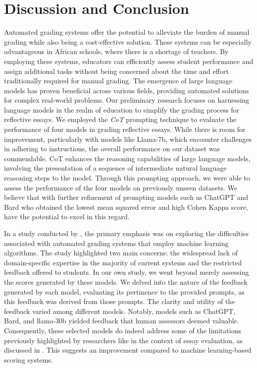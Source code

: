 \documentclass{article}
\begin{document}
\section{Discussion and Conclusion }

Automated grading systems offer the potential to alleviate the burden of manual grading while also being a cost-effective solution. These systems can be especially advantageous in African schools, where there is a shortage of teachers. By employing these systems, educators can efficiently assess student performance and assign additional tasks without being concerned about the time and effort traditionally required for manual grading. The emergence of large language models has proven beneficial across various fields, providing automated solutions for complex real-world problems.  Our preliminary research focuses on harnessing language models in the realm of education to simplify the grading process for reflective essays. We employed the \textit{CoT} prompting technique to evaluate the performance of four models in grading reflective essays. While there is room for improvement, particularly with models like Llama-7b, which encounter challenges in adhering to instructions, the overall performance on our dataset was commendable.
CoT enhances the reasoning capabilities of large language models, involving the presentation of a sequence of intermediate natural language reasoning steps to the model. Through this prompting approach, we were able to assess the performance of the four models on previously unseen datasets. We believe that with further refinement of prompting models such as ChatGPT and Bard who obtained the lowest mean squared error and high Cohen Kappa score, have the potential to excel in this regard. 

In a study conducted by \cite{ramesh2022automated}, the primary emphasis was on exploring the difficulties associated with automated grading systems that employ machine learning algorithms. The study highlighted two main concerns: the widespread lack of domain-specific expertise in the majority of current systems and the restricted feedback offered to students. In our own study, we went beyond merely assessing the scores generated by these models. We delved into the nature of the feedback generated by each model, evaluating its pertinence to the provided prompts, as this feedback was derived from those prompts. The clarity and utility of the feedback varied among different models. Notably, models such as ChatGPT, Bard, and llama-30b yielded feedback that human assessors deemed valuable. Consequently, these selected models do indeed address some of the limitations previously highlighted by researchers like \cite{ramesh2022automated} in the context of essay evaluation, as discussed in \cite{ramesh2022automated}. This suggests an improvement compared to machine learning-based scoring systems.
\end{document}
